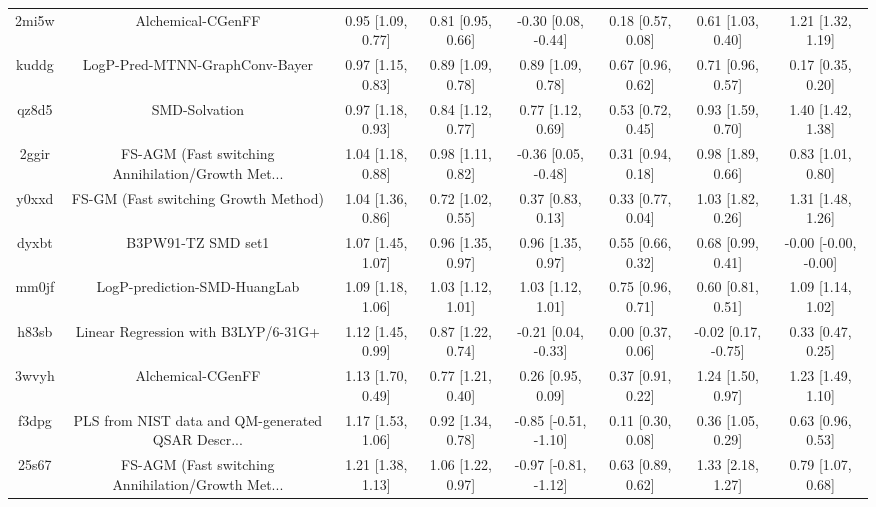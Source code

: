 \documentclass{article}
\begin{document}
\begin{center}
\begin{longtable}{|cccccccc|}
 2mi5w &                                  Alchemical-CGenFF &  0.95 [1.09, 0.77] &  0.81 [0.95, 0.66] &   -0.30 [0.08, -0.44] &  0.18 [0.57, 0.08] &     0.61 [1.03, 0.40] &     1.21 [1.32, 1.19] \\
 kuddg &                     LogP-Pred-MTNN-GraphConv-Bayer &  0.97 [1.15, 0.83] &  0.89 [1.09, 0.78] &     0.89 [1.09, 0.78] &  0.67 [0.96, 0.62] &     0.71 [0.96, 0.57] &     0.17 [0.35, 0.20] \\
 qz8d5 &                                      SMD-Solvation &  0.97 [1.18, 0.93] &  0.84 [1.12, 0.77] &     0.77 [1.12, 0.69] &  0.53 [0.72, 0.45] &     0.93 [1.59, 0.70] &     1.40 [1.42, 1.38] \\
 2ggir &  FS-AGM (Fast switching Annihilation/Growth Met... &  1.04 [1.18, 0.88] &  0.98 [1.11, 0.82] &   -0.36 [0.05, -0.48] &  0.31 [0.94, 0.18] &     0.98 [1.89, 0.66] &     0.83 [1.01, 0.80] \\
 y0xxd &               FS-GM (Fast switching Growth Method) &  1.04 [1.36, 0.86] &  0.72 [1.02, 0.55] &     0.37 [0.83, 0.13] &  0.33 [0.77, 0.04] &     1.03 [1.82, 0.26] &     1.31 [1.48, 1.26] \\
 dyxbt &                                 B3PW91-TZ SMD set1 &  1.07 [1.45, 1.07] &  0.96 [1.35, 0.97] &     0.96 [1.35, 0.97] &  0.55 [0.66, 0.32] &     0.68 [0.99, 0.41] &  -0.00 [-0.00, -0.00] \\
 mm0jf &                       LogP-prediction-SMD-HuangLab &  1.09 [1.18, 1.06] &  1.03 [1.12, 1.01] &     1.03 [1.12, 1.01] &  0.75 [0.96, 0.71] &     0.60 [0.81, 0.51] &     1.09 [1.14, 1.02] \\
 h83sb &                Linear Regression with B3LYP/6-31G+ &  1.12 [1.45, 0.99] &  0.87 [1.22, 0.74] &   -0.21 [0.04, -0.33] &  0.00 [0.37, 0.06] &   -0.02 [0.17, -0.75] &     0.33 [0.47, 0.25] \\
 3wvyh &                                  Alchemical-CGenFF &  1.13 [1.70, 0.49] &  0.77 [1.21, 0.40] &     0.26 [0.95, 0.09] &  0.37 [0.91, 0.22] &     1.24 [1.50, 0.97] &     1.23 [1.49, 1.10] \\
 f3dpg &  PLS from NIST data and QM-generated QSAR Descr... &  1.17 [1.53, 1.06] &  0.92 [1.34, 0.78] &  -0.85 [-0.51, -1.10] &  0.11 [0.30, 0.08] &     0.36 [1.05, 0.29] &     0.63 [0.96, 0.53] \\
 25s67 &  FS-AGM (Fast switching Annihilation/Growth Met... &  1.21 [1.38, 1.13] &  1.06 [1.22, 0.97] &  -0.97 [-0.81, -1.12] &  0.63 [0.89, 0.62] &     1.33 [2.18, 1.27] &     0.79 [1.07, 0.68] \\

\end{longtable}
\end{center}
\end{document}
